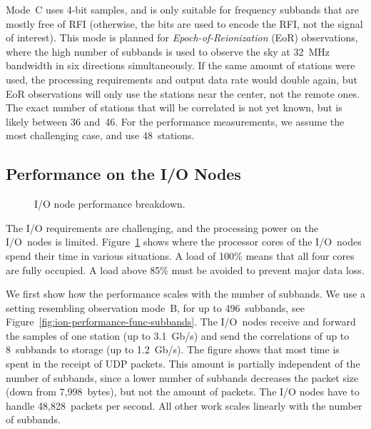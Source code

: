 \documentclass{sig-alternate}
\begin{document}
Mode~\textsf{C} uses 4-bit samples, and is only suitable for frequency
subbands that are mostly free of RFI (otherwise, the bits are used to encode
the RFI, not the signal of interest).
This mode is planned for \emph{Epoch-of-Reionization} (EoR) observations, where the
high number of subbands is used to observe the sky at 32~MHz bandwidth in six
directions simultaneously.
If the same amount of stations were used, the processing requirements and
output data rate would double again, but EoR observations will only use the
stations near the center, not the remote ones.
The exact number of stations that will be correlated is not yet known, but is
likely between 36 and~46.
For the performance measurements, we assume the most challenging
case, and use 48~stations.


\subsection{Performance on the I/O Nodes}
\label{sec:ION-performance}

\begin{figure}[ht]
\hfill
{}
\caption{I/O node performance breakdown.}
\label{fig:ion-performance}
\end{figure}

The I/O requirements are challenging, and the processing power on the I/O~nodes
is limited.
Figure~\ref{fig:ion-performance} shows where the processor cores of the
I/O~nodes spend their time in various situations.
A load of 100\% means that all four cores are fully occupied.
A load above 85\% must be avoided to prevent major data loss.

We first show how the performance scales with the number of subbands.
We use a setting resembling observation mode~\textsf{B}, for up
to 496~subbands, see Figure~\ref{fig:ion-performance-func-subbands}.
The I/O~nodes receive and forward the samples
of one station (up to 3.1~Gb/s) and send the correlations of up to 8~subbands
to storage (up to 1.2~Gb/s).
The figure shows that most time is spent in the receipt of UDP packets.
This amount is partially independent of the number of subbands, since a lower
number of subbands decreases the packet size (down from 7,998~bytes), but not
the amount of packets.
The I/O nodes have to handle 48,828~packets per second.
All other work scales linearly with the number of subbands.
\end{document}
